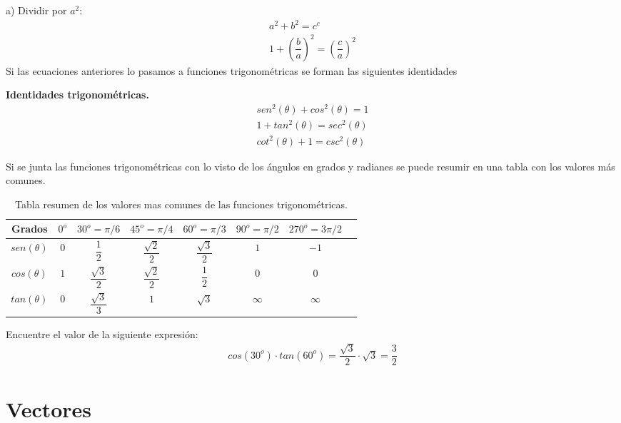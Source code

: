 \noindent a) Dividir por $a^{2}:$
\begin{eqnarray}
a^{2}+b^{2}=c^{c} \\
1+\left(\dfrac{b}{a}\right)^{2}=\left(\dfrac{c}{a}\right)^{2}
\end{eqnarray}
Si las ecuaciones anteriores lo pasamos a funciones trigonométricas se forman las siguientes identidades

\begin{mydef}
\textbf{Identidades trigonométricas. }
\begin{eqnarray}
sen^{2}(\theta)+cos^{2}(\theta)=1\\
1+tan^{2}(\theta)=sec^{2}(\theta)\\
cot^{2}(\theta)+1=csc^{2}(\theta)
\end{eqnarray}
\end{mydef}

Si se junta las funciones trigonométricas con lo visto de los ángulos en grados y radianes se puede resumir en una tabla con los valores más comunes.

\begin{table}[h!]
\begin{center}
 \begin{tabular}{|c|c|c|c|c|c|c|c|}
 \hline
Grados &$0^{o}$&$30^{o}=\pi/6$&$45^{o}=\pi/4$&$60^{o}=\pi/3$&$90^{o}=\pi/2$&$270^{o}=3\pi/2$ \\
 \hline
 $sen(\theta)$&$0$&$\dfrac{1}{2}$&$\dfrac{\sqrt{2}}{2}$&$\dfrac{\sqrt{3}}{2}$&$1$&$-1$ \\
 \hline
 $cos(\theta)$&$1$&$\dfrac{\sqrt{3}}{2}$&$\dfrac{\sqrt{2}}{2}$&$\dfrac{1}{2}$&$0$&$0$ \\
 \hline
 $tan(\theta)$&$0$&$\dfrac{\sqrt{3}}{3}$&$1$&$\sqrt{3}$&$\infty$&$\infty$ \\
 \hline
 \end{tabular}
 \caption{Tabla resumen de los valores mas comunes de las funciones trigonométricas.}
 \end{center}
\end{table}

\begin{myexample}
Encuentre el valor de la siguiente expresión:
\begin{eqnarray*}
cos(30^{o})\cdot tan(60^{o})=\dfrac{\sqrt{3}}{2}\cdot\sqrt{3}=\dfrac{3}{2}
\end{eqnarray*}
\end{myexample}

\section{Vectores}

